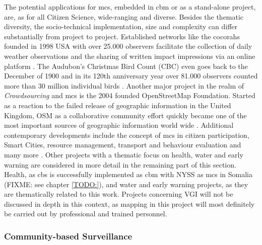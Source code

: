 The potential applications for \acrshort*{mcs}, embedded in \acrshort*{cbm} or as a stand-alone project, are, as for all Citizen Science, wide-ranging and diverse. Besides the thematic diversity, the socio-technical implementation, size and complexity can differ substantially from project to project. Established networks like the \acrfull*{cocorahs} founded in 1998 USA with over 25.000 observers facilitate the collection of daily weather observations and the sharing of written impact impressions via an online platform \autocite{cocorahsCoCoRaHSCommunityCollaborative2023,lackstromBackyardHydroclimatologyCitizen2022}. The Audubon's Christmas Bird Count (CBC) even goes back to the December of 1900 and in its 120th anniversary year over 81.000 observers counted more than 30 million individual birds \autocite{lebaron122ndChristmasBird2022}. Another major project in the realm of \textit{Crowdsourcing} and \acrshort*{mcs} is the 2004 founded OpenStreetMap Foundation. Started as a reaction to the failed release of geographic information in the United Kingdom, OSM as a collaborative community effort quickly became one of the most important sources of geographic information world wide \autocite{bennettOpenStreetMap2010, openstreetmapcontributorsOpenStreetMapBasemap2020}. Additional contemporary developments include the concept of \acrshort*{mcs} in citizen participation, Smart Cities, resource management, transport and behaviour evaluation and many more \autocite{dipasDIPASOrgDIPAS2023,europeancommissionCitizencentredApproachSmart2021, wangSurveyApplicationKey2022}. 
Other projects with a thematic focus on health, water and early warning are considered in more detail in the remaining part of this section. Health, as \acrfull*{cbs} is successfully implemented as \acrshort*{cbm} with NYSS as \acrshort*{mcs} in Somalia (FIXME: see chapter \ref*{TODO:}), and water and early warning projects, as they are thematically related to this work. Projects concerning VGI will not be discussed in depth in this context, as mapping in this project will most definitely be carried out by professional and trained personnel. 

\subsubsection*{Community-based Surveillance}\label{subsubsec:cbs}

